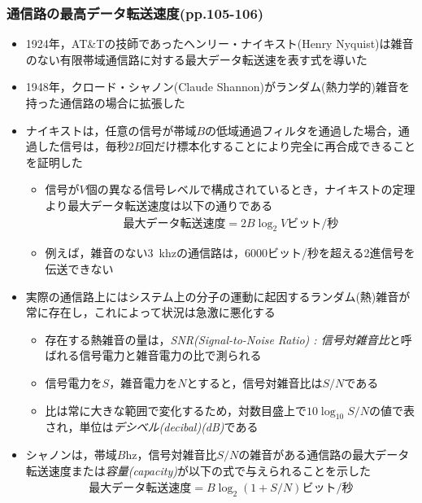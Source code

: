 \documentclass[a4paper]{ltjsarticle}
\begin{document}
    \subsubsection{通信路の最高データ転送速度(pp.105-106)}
      \begin{itemize}
        \item 1924年，AT\&Tの技師であったヘンリー・ナイキスト(Henry Nyquist)は雑音のない有限帯域通信路に対する最大データ転送速を表す式を導いた
        \item 1948年，クロード・シャノン(Claude Shannon)がランダム(熱力学的)雑音を持った通信路の場合に拡張した
        \item ナイキストは，任意の信号が帯域$B$の低域通過フィルタを通過した場合，通過した信号は，毎秒$2B$回だけ標本化することにより完全に再合成できることを証明した
        \begin{itemize}
          \item 信号が$V$個の異なる信号レベルで構成されているとき，ナイキストの定理より最大データ転送速度は以下の通りである
            \begin{align}
              \text{最大データ転送速度} = 2B \log_2 V \text{ビット/秒}
            \end{align}
          \item 例えば，雑音のない\SI{3}{khz}の通信路は，6000ビット/秒を超える2進信号を伝送できない
        \end{itemize}
        \item 実際の通信路上にはシステム上の分子の運動に起因するランダム(熱)雑音が常に存在し，これによって状況は急激に悪化する
        \begin{itemize}
          \item 存在する熱雑音の量は，\emph{SNR(Signal-to-Noise Ratio) : 信号対雑音比}と呼ばれる信号電力と雑音電力の比で測られる
          \item 信号電力を$S$，雑音電力を$N$とすると，信号対雑音比は$S/N$である
          \item 比は常に大きな範囲で変化するため，対数目盛上で$10 \log_{10} S/N$の値で表され，単位は\emph{デシベル(decibal)(dB)}である
        \end{itemize}
        \item シャノンは，帯域$B$\si{hz}，信号対雑音比$S/N$の雑音がある通信路の最大データ転送速度または\emph{容量(capacity)}が以下の式で与えられることを示した
          \begin{align}
            \text{最大データ転送速度} = B \log_2 (1+S/N) \text{ビット/秒}
          \end{align}
      \end{itemize}
\end{document}
